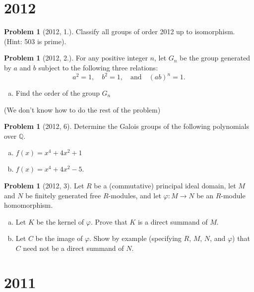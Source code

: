 \documentclass{article}
\newcommand{\<}{\langle} %
\renewcommand{\>}{\rangle} %
\theoremstyle{plain}
\theoremstyle{remark}
\theoremstyle{definition}
\newtheorem{examproblem}[equation]{Problem}
\begin{document}
\newpage

\section{2012}

\begin{examproblem}[2012, 1.]
	Classify all groups of order 2012 up to isomorphism. (Hint: 503 is prime).
\end{examproblem}

\begin{examproblem}[2012, 2.]
	For any positive integer $n$, let $G_n$ be the group generated by
	$a$ and $b$ subject to the following three relations:
	$$
	a^2=1, \quad b^2=1, \quad \text{and} \quad (ab)^n=1.
	$$
	\begin{enumerate}[(a)]
		\item Find the order of the group $G_n$
	\end{enumerate}
\end{examproblem}
(We don't know how to do the rest of the problem)

\begin{examproblem}[2012, 6]
	Determine the Galois groups of the following polynomials over $\mathbb Q$.
	\begin{enumerate}[(a)]
		\item $f(x)=x^4+4x^2+1$
		\item $f(x)=x^4+4x^2-5$.
	\end{enumerate}
\end{examproblem}

\begin{examproblem}[2012, 3]
	Let $R$ be a (commutative) principal ideal domain, let $M$ and $N$ be
	finitely generated free $R$-modules, and let $\varphi:M\rightarrow N$ be
	an $R$-module homomorphism.
	\begin{enumerate}[(a)]
		\item Let $K$ be the kernel of $\varphi$. Prove that
			$K$ is a direct summand of $M$.
		\item Let $C$ be the image of $\varphi$. Show by example
			(specifying $R$, $M$, $N$, and $\varphi$) that $C$
			need not be a direct summand of $N$.
	\end{enumerate}
\end{examproblem}

\newpage

\section{2011}
\end{document}
